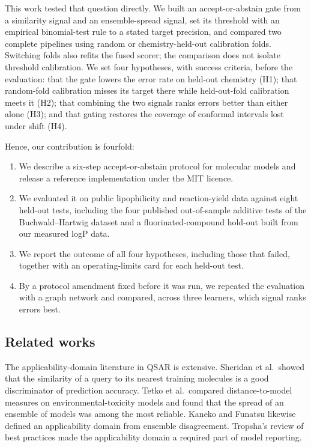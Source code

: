 \documentclass[11pt,letterpaper]{article}
\begin{document}
This work tested that question directly. We built an accept-or-abstain gate from a similarity signal and an ensemble-spread signal, set its threshold with an empirical binomial-test rule to a stated target precision, and compared two complete pipelines using random or chemistry-held-out calibration folds. Switching folds also refits the fused scorer; the comparison does not isolate threshold calibration. We set four hypotheses, with success criteria, before the evaluation: that the gate lowers the error rate on held-out chemistry (H1); that random-fold calibration misses its target there while held-out-fold calibration meets it (H2); that combining the two signals ranks errors better than either alone (H3); and that gating restores the coverage of conformal intervals lost under shift (H4).

Hence, our contribution is fourfold:
\begin{enumerate}
\item We describe a six-step accept-or-abstain protocol for molecular models and release a reference implementation under the MIT licence.
\item We evaluated it on public lipophilicity and reaction-yield data against eight held-out tests, including the four published out-of-sample additive tests of the Buchwald--Hartwig dataset and a fluorinated-compound hold-out built from our measured logP data.
\item We report the outcome of all four hypotheses, including those that failed, together with an operating-limits card for each held-out test.
\item By a protocol amendment fixed before it was run, we repeated the evaluation with a graph network and compared, across three learners, which signal ranks errors best.
\end{enumerate}

\subsection{Related works}

The applicability-domain literature in QSAR is extensive. Sheridan et al.\ showed that the similarity of a query to its nearest training molecules is a good discriminator of prediction accuracy.\cite{sheridan2004} Tetko et al.\ compared distance-to-model measures on environmental-toxicity models and found that the spread of an ensemble of models was among the most reliable.\cite{tetko2008} Kaneko and Funatsu likewise defined an applicability domain from ensemble disagreement.\cite{kaneko2014} Tropsha's review of best practices made the applicability domain a required part of model reporting.\cite{tropsha2010}
\end{document}
